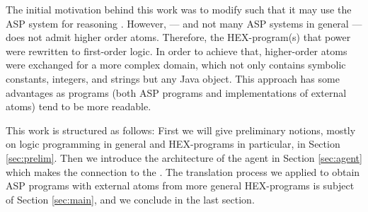 The initial motivation behind this work was to modify \ah such that it may use the \al ASP system for reasoning \cite{blend}. However, \al --- and not many ASP systems in general --- does not admit higher order atoms. Therefore, the HEX-program(s) that power \ah were rewritten to first-order logic. In order to achieve that, higher-order atoms were exchanged for a more complex domain, which not only contains symbolic constants, integers, and strings but any Java object. This approach has some advantages as programs (both ASP programs and implementations of external atoms) tend to be more readable.

This work is structured as follows: First we will give preliminary notions, mostly on logic programming in general and HEX-programs in particular, in Section \ref{sec:prelim}. Then we introduce the architecture of the \ah agent in Section \ref{sec:agent} which makes the connection to the \abc. The translation process we applied to obtain ASP programs with external atoms from more general HEX-programs is subject of Section \ref{sec:main}, and we  conclude in the last section.